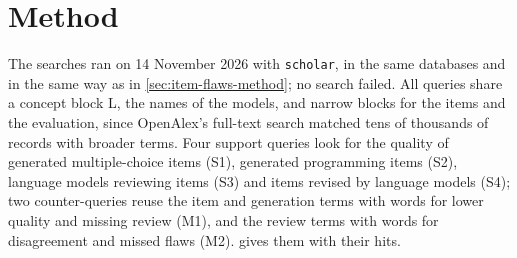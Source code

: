 \section{Method}
\label{sec:llm-items-method}

The searches ran on 14 November 2026 with \texttt{scholar}, in the same
databases and in the same way as in \cref{sec:item-flaws-method}; no
search failed.  All queries share a concept block L, the names of the
models, and narrow blocks for the items and the evaluation, since
OpenAlex's full-text search matched tens of thousands of records with
broader terms.  Four support queries look for the quality of generated
multiple-choice items (S1), generated programming items (S2), language
models reviewing items (S3) and items revised by language models (S4);
two counter-queries reuse the item and generation terms with words for
lower quality and missing review (M1), and the review terms with words for
disagreement and missed flaws (M2).  
gives them with their hits.

